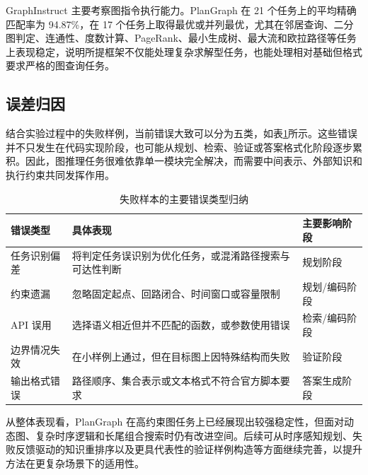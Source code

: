 GraphInstruct 主要考察图指令执行能力。PlanGraph 在 21 个任务上的平均精确匹配率为 94.87\%，在 17 个任务上取得最优或并列最优，尤其在邻居查询、二分图判定、连通性、度数计算、PageRank、最小生成树、最大流和欧拉路径等任务上表现稳定，说明所提框架不仅能处理复杂求解型任务，也能处理相对基础但格式要求严格的图查询任务。

\subsection{误差归因}

结合实验过程中的失败样例，当前错误大致可以分为五类，如表\ref{tab:error_taxonomy}所示。这些错误并不只发生在代码实现阶段，也可能从规划、检索、验证或答案格式化阶段逐步累积。因此，图推理任务很难依靠单一模块完全解决，而需要中间表示、外部知识和执行约束共同发挥作用。

\begin{table}[htbp]
\centering
\small
\caption{失败样本的主要错误类型归纳}
\label{tab:error_taxonomy}
\begin{tabular}{m{3cm}m{4.5cm}m{5cm}}
\toprule
错误类型 & 具体表现 & 主要影响阶段 \\
\midrule
任务识别偏差 & 将判定任务误识别为优化任务，或混淆路径搜索与可达性判断 & 规划阶段 \\
约束遗漏 & 忽略固定起点、回路闭合、时间窗口或容量限制 & 规划/编码阶段 \\
API 误用 & 选择语义相近但并不匹配的函数，或参数使用错误 & 检索/编码阶段 \\
边界情况失效 & 在小样例上通过，但在目标图上因特殊结构而失败 & 验证阶段 \\
输出格式错误 & 路径顺序、集合表示或文本格式不符合官方脚本要求 & 答案生成阶段 \\
\bottomrule
\end{tabular}
\end{table}

从整体表现看，PlanGraph 在高约束图任务上已经展现出较强稳定性，但面对动态图、复杂时序逻辑和长尾组合搜索时仍有改进空间。后续可从时序感知规划、失败反馈驱动的知识重排序以及更具代表性的验证样例构造等方面继续完善，以提升方法在更复杂场景下的适用性。
